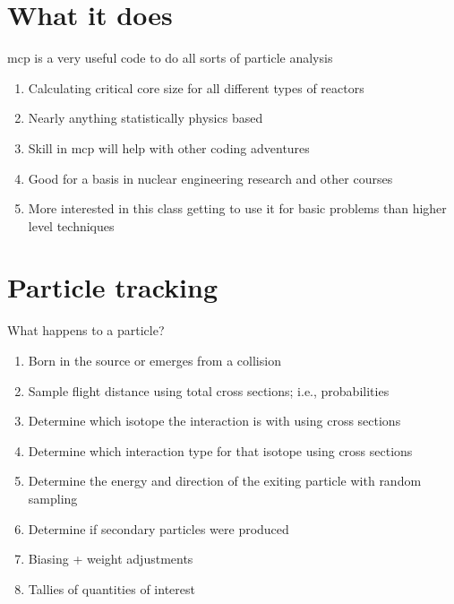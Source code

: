 \documentclass[aspectratio=1610,pdftex,dvipsnames,compress,xcolor={dvipsnames}]{beamer}
\newcommand{\acs}{\acrshort} %
\begin{document}
\section{What it does}


\addtocounter{framenumber}{-2} 
\begin{frame}{\acs{mcp} is a very useful code to do all sorts of particle analysis}
    \begin{enumerate}[series=outerlist,topsep=0pt,itemsep=21pt,leftmargin=*,label=(\arabic*)]
        \item[]Calculating critical core size for all different types of reactors
        \item[]Nearly anything statistically physics based
        \item[]Skill in \acs{mcp} will help with other coding adventures
        \item[]Good for a basis in nuclear engineering research and other courses
        \item[]More interested in this class getting to use it for basic problems than higher level techniques
    \end{enumerate}
\end{frame}


\section{Particle tracking}


\addtocounter{framenumber}{-1} 
\begin{frame}{What happens to a particle?}
    \begin{enumerate}[series=outerlist,topsep=0pt,itemsep=17pt,leftmargin=*,label=(\arabic*)]
        \item[]Born in the source or emerges from a collision
        \item[]Sample flight distance using total cross sections; i.e., probabilities
        \item[]Determine which isotope the interaction is with using cross sections
        \item[]Determine which interaction type for that isotope using cross sections
        \item[]Determine the energy and direction of the exiting particle with random sampling
        \item[]Determine if secondary particles were produced
        \item[]Biasing + weight adjustments
        \item[]Tallies of quantities of interest
    \end{enumerate}
\end{frame}
\end{document}

